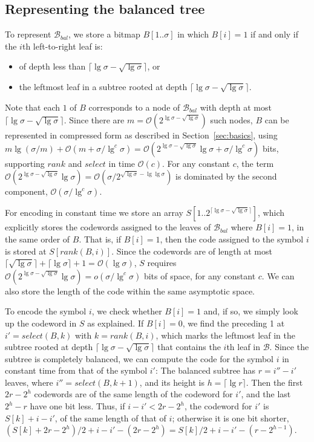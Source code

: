 \documentclass[preprint,12pt]{elsarticle}
\newcommand{\Oh}[1]{\ensuremath{\mathcal{O}\!\left({#1}\right)}}
\newcommand{\B}{\mathcal{B}}
\renewcommand{\log}{\lg}
\begin{document}
\subsection{Representing the balanced tree}

To represent $\B_{bal}$, we store a bitmap \(B [1..\sigma]\) in which \(B [i] = 1\) if and only if the $i$th left-to-right leaf is:
\begin{itemize}
\item of depth less than \(\lceil \lg \sigma  - \sqrt{\lg \sigma} \rceil\), or 
\item the leftmost leaf in a subtree rooted at depth \(\lceil \lg \sigma  - \sqrt{\lg \sigma} \rceil\).  
\end{itemize}
Note that each $1$ of $B$ corresponds to a node of $\B_{bal}$ with depth at most
$\lceil \lg \sigma  - \sqrt{\lg \sigma} \rceil$. Since there are
$m=\Oh{2^{\lg \sigma  - \sqrt{\lg \sigma}}}$ such nodes, $B$ can be 
represented in compressed form as described in Section~\ref{sec:basics}, using
$m\log(\sigma/m)+\Oh{m+\sigma/\log^c \sigma} = 
\Oh{2^{\lg \sigma-\sqrt{\lg \sigma}} \lg\sigma + \sigma/\log^c \sigma}$ bits,
supporting $rank$ and $select$ in time $\Oh{c}$. For any constant $c$, the
term $\Oh{2^{\lg \sigma-\sqrt{\lg \sigma}} \lg\sigma} = 
\Oh{\sigma / 2^{\sqrt{\lg \sigma}-\lg\lg\sigma}}$ is dominated by the second
component, $\Oh{\sigma/\log^c \sigma}$.

For encoding in constant time we store an array \(S[1..2^{\lceil \lg \sigma  - \sqrt{\lg \sigma} \rceil}]\), which explicitly stores the codewords assigned to 
the leaves of $\B_{bal}$ where $B[i]=1$, in the same order of $B$. That is, if
$B[i]=1$, then the code assigned to the symbol $i$ is stored at $S[rank(B,i)]$. Since the codewords are of length at most $\lceil\sqrt{\lg\sigma}\rceil+
\lceil\lg\sigma\rceil+1=\Oh{\log\sigma}$, $S$ requires 
\(\Oh{2^{\lg \sigma - \sqrt{\lg \sigma}} \log \sigma} = o(\sigma / \log^c \sigma)\) bits of space, for any constant $c$. We can
also store the length of the code within the same asymptotic space.

To encode the symbol $i$, we check whether \(B [i] = 1\) and, if so, we simply look up the codeword in $S$ as explained.  If \(B [i] = 0\), we find the preceding 1 at $i'=select(B,k)$ with $k=rank(B,i)$, which marks the leftmost leaf in the subtree rooted at depth \(\lceil \lg \sigma  - \sqrt{\lg \sigma} \rceil\) that contains the $i$th leaf in $\B$. Since the subtree is completely balanced, we can compute the code for the symbol $i$ in constant time from that of the symbol $i'$: The balanced subtree has $r=i''-i'$ leaves, where
$i'' = select(B,k+1)$, and its height is $h=\lceil \lg r\rceil$. Then
the first $2r-2^h$ codewords are of the same length of the codeword for $i'$,
and the last $2^h-r$ have one bit less. Thus, if $i-i' < 2r-2^h$, the codeword
for $i'$ is $S[k]+i-i'$, of the same length of that of $i$; otherwise
it is one bit shorter, $(S[k]+2r-2^h)/2+i-i'-(2r-2^h) =
S[k]/2+i-i'-(r-2^{h-1})$.
\end{document}
